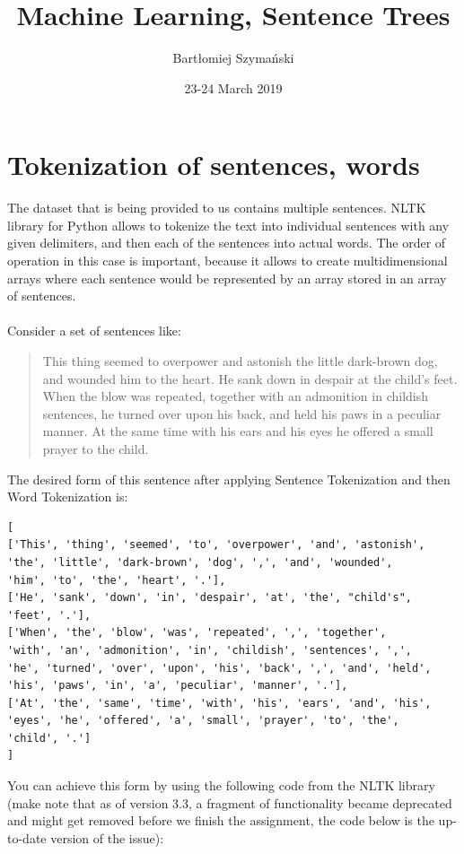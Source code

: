\documentclass{article}
\title{Machine Learning, Sentence Trees}
\author{Bartłomiej Szymański}
\date{23-24 March 2019}
\begin{document}
\maketitle

\section{Tokenization of sentences, words}
The dataset that is being provided to us contains multiple sentences. NLTK library for Python allows to tokenize\cite{Tokenization} the text into individual sentences with any given delimiters, and then each of the sentences into actual words. The order of operation in this case is important, because it allows to create multidimensional arrays where each sentence would be represented by an array stored in an array of sentences.\\ \\
Consider a set of sentences like:
\begin{quote}
This thing seemed to overpower and astonish the little dark-brown dog, and wounded him to the heart. He sank down in despair at the child's feet. When the blow was repeated, together with an admonition in childish sentences, he turned over upon his back, and held his paws in a peculiar manner. At the same time with his ears and his eyes he offered a small prayer to the child.
\end{quote}
The desired form of this sentence after applying Sentence Tokenization and then Word Tokenization is:
\begin{verbatim}
[
['This', 'thing', 'seemed', 'to', 'overpower', 'and', 'astonish', 
'the', 'little', 'dark-brown', 'dog', ',', 'and', 'wounded', 
'him', 'to', 'the', 'heart', '.'],
['He', 'sank', 'down', 'in', 'despair', 'at', 'the', "child's", 
'feet', '.'],
['When', 'the', 'blow', 'was', 'repeated', ',', 'together', 
'with', 'an', 'admonition', 'in', 'childish', 'sentences', ',', 
'he', 'turned', 'over', 'upon', 'his', 'back', ',', 'and', 'held', 
'his', 'paws', 'in', 'a', 'peculiar', 'manner', '.'],
['At', 'the', 'same', 'time', 'with', 'his', 'ears', 'and', 'his', 
'eyes', 'he', 'offered', 'a', 'small', 'prayer', 'to', 'the', 
'child', '.']
]
\end{verbatim}
You can achieve this form by using the following code from the NLTK library (make note that as of version 3.3, a fragment of functionality became deprecated and might get removed before we finish the assignment, the code below is the up-to-date version of the issue)\cite{Demo of TweetTokenizer}\cite{New NLTK Tokenizer}:
\end{document}
